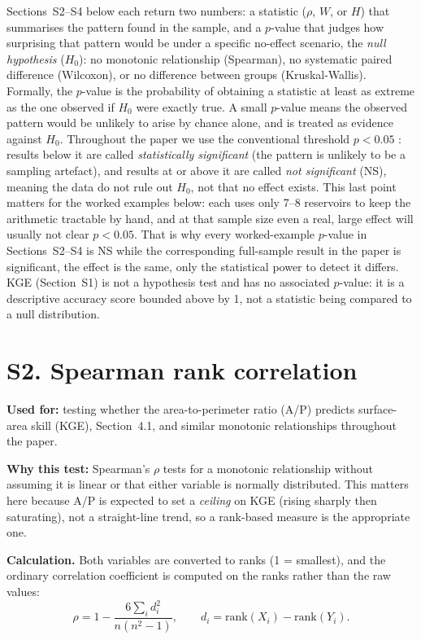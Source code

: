\documentclass[12pt,authoryear]{elsarticle}
\begin{document}
Sections~S2--S4 below each return two numbers: a statistic ($\rho$, $W$, or
$H$) that summarises the pattern found in the sample, and a $p$-value that
judges how surprising that pattern would be under a specific no-effect
scenario, the \emph{null hypothesis} ($H_0$): no monotonic relationship
(Spearman), no systematic paired difference (Wilcoxon), or no difference
between groups (Kruskal-Wallis). Formally, the $p$-value is the probability
of obtaining a statistic at least as extreme as the one observed if $H_0$
were exactly true. A small $p$-value means the observed pattern would be
unlikely to arise by chance alone, and is treated as evidence against
$H_0$. Throughout the paper we use the conventional threshold $p<0.05$
\citep{Fisher1925}: results below it are called \emph{statistically
significant} (the pattern is unlikely to be a sampling artefact), and
results at or above it are called \emph{not significant} (NS), meaning the
data do not rule out $H_0$, not that no effect exists. This last point
matters for the worked examples below: each uses only 7--8 reservoirs to
keep the arithmetic tractable by hand, and at that sample size even a real,
large effect will usually not clear $p<0.05$. That is why every
worked-example $p$-value in Sections~S2--S4 is NS while the corresponding
full-sample result in the paper is significant, the effect is the same,
only the statistical power to detect it differs. KGE (Section~S1) is not a
hypothesis test and has no associated $p$-value: it is a descriptive
accuracy score bounded above by 1, not a statistic being compared to a null
distribution.

\section*{S2. Spearman rank correlation \citep{Spearman1904}}

\textbf{Used for:} testing whether the area-to-perimeter ratio (A/P)
predicts surface-area skill (KGE), Section~4.1, and similar monotonic
relationships throughout the paper.

\textbf{Why this test:} Spearman's $\rho$ tests for a monotonic relationship
without assuming it is linear or that either variable is normally
distributed. This matters here because A/P is expected to set a
\emph{ceiling} on KGE (rising sharply then saturating), not a straight-line
trend, so a rank-based measure is the appropriate one.

\textbf{Calculation.} Both variables are converted to ranks (1 = smallest),
and the ordinary correlation coefficient is computed on the ranks rather
than the raw values:
\[
\rho = 1 - \frac{6 \sum_i d_i^2}{n(n^2-1)}, \qquad
d_i = \mathrm{rank}(X_i) - \mathrm{rank}(Y_i).
\]
\end{document}
